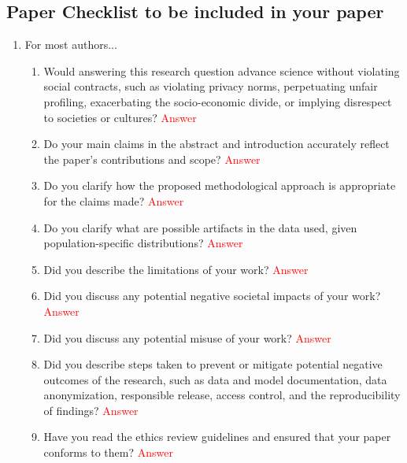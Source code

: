 \documentclass[letterpaper]{article} %
\newcommand{\answerTODO}[1]{\textcolor{red}{#1}}
\begin{document}
\subsection{Paper Checklist to be included in your paper}

\begin{enumerate}

\item For most authors...
\begin{enumerate}
    \item  Would answering this research question advance science without violating social contracts, such as violating privacy norms, perpetuating unfair profiling, exacerbating the socio-economic divide, or implying disrespect to societies or cultures?
    \answerTODO{Answer}
  \item Do your main claims in the abstract and introduction accurately reflect the paper's contributions and scope?
    \answerTODO{Answer}
   \item Do you clarify how the proposed methodological approach is appropriate for the claims made? 
    \answerTODO{Answer}
   \item Do you clarify what are possible artifacts in the data used, given population-specific distributions?
    \answerTODO{Answer}
  \item Did you describe the limitations of your work?
    \answerTODO{Answer}
  \item Did you discuss any potential negative societal impacts of your work?
    \answerTODO{Answer}
      \item Did you discuss any potential misuse of your work?
    \answerTODO{Answer}
    \item Did you describe steps taken to prevent or mitigate potential negative outcomes of the research, such as data and model documentation, data anonymization, responsible release, access control, and the reproducibility of findings?
    \answerTODO{Answer}
  \item Have you read the ethics review guidelines and ensured that your paper conforms to them?
    \answerTODO{Answer}
\end{enumerate}


\end{enumerate}
\end{document}
